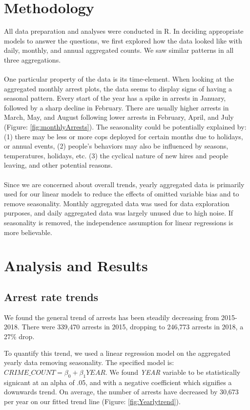 \documentclass[11pt]{article}\usepackage[]{graphicx}\usepackage[]{color}
\begin{document}
\section{Methodology}
All data preparation and analyses were conducted in R. In deciding appropriate models to answer the questions, we first explored how the data looked like with daily, monthly, and annual aggregated counts. We saw similar patterns in all three aggregations.
\\\\
One particular property of the data is its time-element. When looking at the aggregated monthly arrest plots, the data seems to display signs of having a seasonal pattern. Every start of the year has a spike in arrests in January, followed by a sharp decline in February. There are usually higher arrests in March, May, and August following lower arrests in February, April, and July (Figure: \ref{fig:monthlyArrests}). The seasonality could be potentially explained by: (1) there may be less or more cops deployed for certain months due to holidays, or annual events, (2) people's behaviors may also be influenced by seasons, temperatures, holidays, etc. (3) the cyclical nature of new hires and people leaving, and other potential reasons. 
\\\\
Since we are concerned about overall trends, yearly aggregated data is primarily used for our linear models to reduce the effects of omitted variable bias and to remove seasonality. Monthly aggregated data was used for data exploration purposes, and daily aggregated data was largely unused due to high noise.  If seasonality is removed, the independence assumption for linear regressions is more believable.

\section{Analysis and Results}
\subsection{Arrest rate trends}
We found the general trend of arrests has been steadily decreasing from 2015-2018. There were 339,470 arrests in 2015, dropping to 246,773 arrests in 2018, a 27\% drop.

To quantify this trend, we used a linear regression model on the aggregated yearly data removing seasonality. The specified model is: $CRIME\_COUNT=\beta_0+\beta_1YEAR$. We found \textit{YEAR} variable to be statistically signicant at an alpha of .05, and with a negative coefficient which signifies a downwards trend. On average, the number of arrests have decreased by 30,673 per year on our fitted trend line (Figure: \ref{fig:Yearlytrend}).
\end{document}
